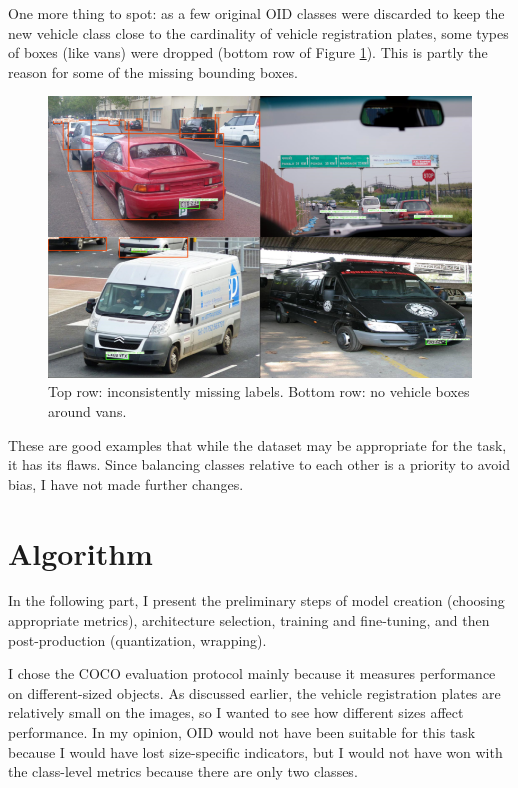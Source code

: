 One more thing to spot: as a few original OID classes were discarded to keep the new vehicle class close to the cardinality of vehicle registration plates, some types of boxes (like vans) were dropped (bottom row of Figure \ref{fig:missing_labels}). This is partly the reason for some of the missing bounding boxes.

\begin{figure}[htb]
 \centerline{\includegraphics[width=0.8\columnwidth]{.//Figure/PlateLocalization/missing_labels.png}}
 \caption{Top row: inconsistently missing labels. Bottom row: no vehicle boxes around vans.}
 \label{fig:missing_labels}
\end{figure}

These are good examples that while the dataset may be appropriate for the task, it has its flaws. Since balancing classes relative to each other is a priority to avoid bias, I have not made further changes.

\section{Algorithm}

In the following part, I present the preliminary steps of model creation (choosing appropriate metrics), architecture selection, training and fine-tuning, and then post-production (quantization, wrapping).

I chose the COCO evaluation protocol mainly because it measures performance on different-sized objects. As discussed earlier, the vehicle registration plates are relatively small on the images, so I wanted to see how different sizes affect performance. In my opinion, OID would not have been suitable for this task because I would have lost size-specific indicators, but I would not have won with the class-level metrics because there are only two classes.

